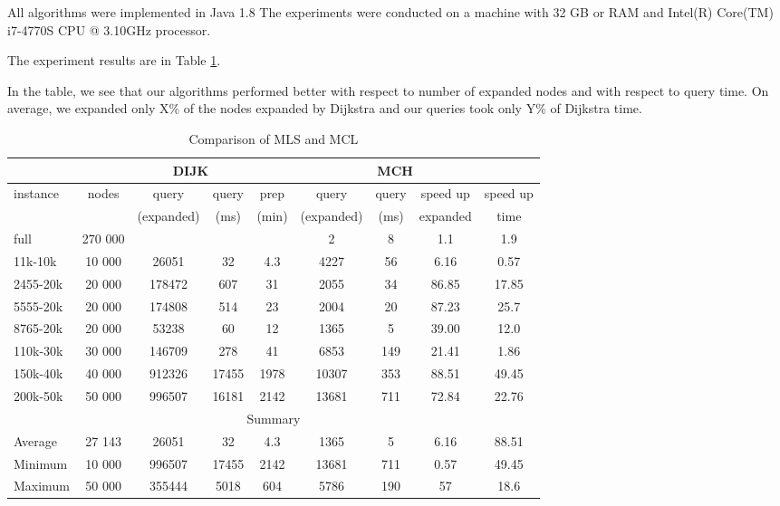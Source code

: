 All algorithms were implemented in Java 1.8 
The experiments were conducted on a machine with 
32 GB or RAM and  Intel(R) Core(TM) i7-4770S CPU @ 3.10GHz processor.

The experiment results are in Table \ref{result}. 

In the table, we see that our algorithms performed better with respect to 
number of expanded nodes and with respect to query time.
On average, we expanded only X\% of the nodes expanded by Dijkstra and our queries 
 took only Y\% of Dijkstra time.


\begin{table}
\tiny
\caption{Comparison of MLS and MCL}
\label{result}
\begin{tabular}{l|c|cc|ccccc}
 & & \multicolumn{2}{c}{DIJK} & \multicolumn{5}{c}{MCH} \\ \cline{3-6} \hline
instance & nodes & query & query & prep & query & query & speed up & speed up \\ \hline
& & (expanded) & (ms) & (min) & (expanded) & (ms) & expanded & time \\ \hline
full & 270 000 & & & &  2 & 8 & 1.1 & 1.9 \\ \hline
11k-10k & 10 000 & 26051 & 32 & 4.3 & 4227 & 56 & 6.16 & 0.57 \\ \hline
2455-20k & 20 000 & 178472 & 607 & 31 & 2055 & 34 & 86.85 & 17.85 \\ \hline
5555-20k & 20 000 & 174808 & 514 & 23 & 2004 & 20 & 87.23 & 25.7 \\ \hline
8765-20k & 20 000 & 53238 & 60 & 12 & 1365 & 5 & 39.00 & 12.0 \\ \hline
110k-30k & 30 000 & 146709 & 278 & 41 & 6853 & 149 & 21.41 & 1.86 \\ \hline
150k-40k & 40 000 & 912326 & 17455 & 1978 & 10307 & 353 & 88.51& 49.45 \\ \hline
200k-50k & 50 000 & 996507 & 16181 & 2142 & 13681 & 711 & 72.84& 22.76 \\ \hline

\multicolumn{9}{c}{Summary} \\ \hline
Average & 27 143 & 26051 & 32 & 4.3 & 1365 & 5 & 6.16 & 88.51 \\ \hline
Minimum & 10 000 & 996507 & 17455 & 2142 & 13681 & 711 & 0.57 & 49.45\\ \hline
Maximum & 50 000 & 355444 & 5018 & 604 & 5786 & 190 & 57 & 18.6 \\ \hline
\end{tabular}
\end{table}
